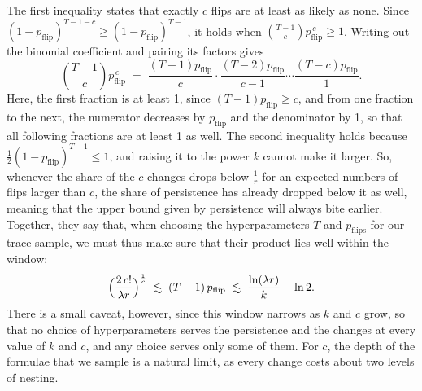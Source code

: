 \documentclass[titlepage,a4paper,11pt]{report}
\begin{document}
    The first inequality states that exactly $c$ flips are at least as likely as none. Since $(1-p_{\text{flip}})^{T-1-c}\ge(1-p_{\text{flip}})^{T-1}$, it holds when $\binom{T-1}{c}p_{\text{flip}}^{\,c}\ge1$. Writing out the binomial coefficient and pairing its factors gives
    \begin{equation*}
        \binom{T-1}{c}p_{\text{flip}}^{\,c}\;=\;\frac{(T-1)p_{\text{flip}}}{c}\cdot\frac{(T-2)p_{\text{flip}}}{c-1}\cdots\frac{(T-c)p_{\text{flip}}}{1}.
    \end{equation*}
    Here, the first fraction is at least 1, since $(T-1)p_{\text{flip}}\ge c$, and from one fraction to the next, the numerator decreases by $p_{\text{flip}}$ and the denominator by 1, so that all following fractions are at least 1 as well. The second inequality holds because $\frac12(1-p_{\text{flip}})^{T-1}\le1$, and raising it to the power $k$ cannot make it larger. So, whenever the share of the $c$ changes drops below $\frac1r$ for an expected numbers of flips larger than $c$, the share of persistence has already dropped below it as well, meaning that the upper bound given by persistence will always bite earlier. Together, they say that, when choosing the hyperparameters $T$ and $p_{\text{flips}}$ for our trace sample, we must thus make sure that their product lies well within the window:
    \begin{equation}\label{eq:flip_window}
        \Bigl(\frac{2\,c!}{\lambda r}\Bigr)^\frac1c\;\lesssim\;(T-1)\,p_{\text{flip}}\;\lesssim\;\frac{\ln(\lambda r)}{k}-\ln 2 .
    \end{equation}
    There is a small caveat, however, since this window narrows as $k$ and $c$ grow, so that no choice of hyperparameters serves the persistence and the changes at every value of $k$ and $c$, and any choice serves only some of them. For $c$, the depth of the formulae that we sample is a natural limit, as every change costs about two levels of nesting.
    
\end{document}
